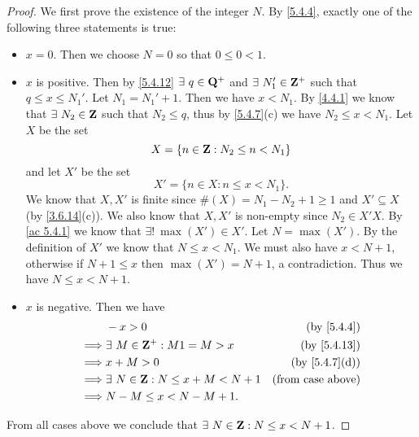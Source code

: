 \begin{proof}
  We first prove the existence of the integer \(N\).
  By \cref{5.4.4}, exactly one of the following three statements is true:
  \begin{itemize}
    \item \(x = 0\).
          Then we choose \(N = 0\) so that \(0 \leq 0 < 1\).
    \item \(x\) is positive.
          Then by \cref{5.4.12} \(\exists\ q \in \Q^+\) and \(\exists\ N_1' \in \mathbf{Z}^+\) such that \(q \leq x \leq N_1'\).
          Let \(N_1 = N_1' + 1\).
          Then we have \(x < N_1\).
          By \cref{4.4.1} we know that \(\exists\ N_2 \in \mathbf{Z}\) such that \(N_2 \leq q\), thus by \cref{5.4.7}(c) we have \(N_2 \leq x < N_1\).
          Let \(X\) be the set
          \[
            X = \{n \in \mathbf{Z} : N_2 \leq n < N_1\}
          \]
          and let \(X'\) be the set
          \[
            X' = \{n \in X : n \leq x < N_1\}.
          \]
          We know that \(X, X'\) is finite since \(\#(X) = N_1 - N_2 + 1 \geq 1\) and \(X' \subseteq X\) (by \cref{3.6.14}(c)).
          We also know that \(X, X'\) is non-empty since \(N_2 \in X'X\).
          By \cref{ac 5.4.1} we know that \(\exists!\ \max(X') \in X'\).
          Let \(N = \max(X')\).
          By the definition of \(X'\) we know that \(N \leq x < N_1\).
          We must also have \(x < N + 1\), otherwise if \(N + 1 \leq x\) then \(\max(X') = N + 1\), a contradiction.
          Thus we have \(N \leq x < N + 1\).
    \item \(x\) is negative.
          Then we have
          \begin{align*}
                     & -x > 0                                   & \text{(by \cref{5.4.4})}    \\
            \implies & \exists\ M \in \Z^+ : M1 = M > x         & \text{(by \cref{5.4.13})}   \\
            \implies & x + M > 0                                & \text{(by \cref{5.4.7}(d))} \\
            \implies & \exists\ N \in \Z : N \leq x + M < N + 1 & \text{(from case above)}    \\
            \implies & N - M \leq x < N - M + 1.
          \end{align*}
  \end{itemize}
  From all cases above we conclude that \(\exists\ N \in \mathbf{Z} : N \leq x < N + 1\).


\end{proof}
